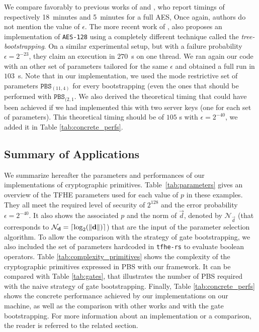 We compare favorably to previous works of \cite{C:GenHalSma12} and \cite{PKC:CorLepTib14}, who report timings of respectively 18~minutes and 5~minutes for a full AES, Once again, authors do not mention the value of $\epsilon$. The more recent work of \cite{DBLP:conf/wahc/TramaCBS23}, also proposes an implementation of \texttt{AES-128} using a completely different technique called the \emph{tree-bootstrapping}. On a similar experimental setup, but with a failure probability $\epsilon=2^{-23}$, they claim an execution in $270$~s on one thread. We ran again our code with an other set of parameters tailored for the same $\epsilon$ and obtained a full run in $103$~s.  Note that in our implementation, we used the mode restrictive set of parameters $\texttt{PBS}_{(11, 4)}$ for every bootstrapping (even the ones that should be performed with $\texttt{PBS}_{(2, 1}$. We also derived the theoretical timing that could have been achieved if we had implemented this with two server keys (one for each set of parameters). This theoretical timing should be of $105$ s with $\epsilon=2^{-40}$, we added it in Table \ref{tab:concrete_perfs}.


\subsection{Summary of Applications}
\label{sec:tables_perfs}


We summarize hereafter the parameters and performances of our implementations of cryptographic primitives. Table~\ref{tab:parameters} gives an overview of the TFHE parameters used for each value of $p$ in these examples. They all meet the required level of security of $2^{128}$ and the error probability $\epsilon=2^{-40}$. It also shows the associated $p$ and the norm of $\vec d$, denoted by $\mathcal{N}_{\vec d}$ (that corresponds to $\mathcal{N}_{\mathbf d} = \lceil \log_2(\lVert \mathbf d \rVert) \rceil$) that are the input of the parameter selection algorithm. To allow the comparison with the strategy of gate bootstrapping, we also included the set of parameters hardcoded in \texttt{tfhe-rs} to evaluate boolean operators. Table \ref{tab:complexity_primitives} shows the complexity of the cryptographic primitives expressed in PBS with our framework. It can be compared with Table \ref{tab:gates}, that illustrates the number of PBS required with the naive strategy of gate bootstrapping. Finally, Table \ref{tab:concrete_perfs} shows the concrete performance achieved by our implementations on our machine, as well as the comparison with other works and with the gate bootstrapping. For more information about an implementation or a comparison, the reader is referred to the related section.

